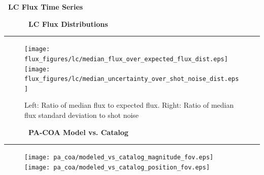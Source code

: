 \vspace{2in}
\centering
{\Huge {\bf \quarter\ LC Flux Time Series}}



\cleardoublepage
\begin{figure}[h!]
  \centering
  \hfill
  {\Huge {\bf \quarter\ LC Flux Distributions}}
  \hfill
\end{figure}
\hrule

\begin{figure}[h!]
  \centering
  \texttt{[image: flux\_figures/lc/median\_flux\_over\_expected\_flux\_dist.eps]}
  \texttt{[image: flux\_figures/lc/median\_uncertainty\_over\_shot\_noise\_dist.eps]}
  \caption{Left: Ratio of median flux to expected flux.  Right: Ratio of median flux standard deviation to shot noise}
\end{figure}


\cleardoublepage
\begin{figure}[h!]
  \centering
  \hfill
  {\Huge {\bf \quarter\ PA-COA Model vs. Catalog}}
  \hfill
\end{figure}
\hrule

\begin{figure}[h!]
  \centering
  \texttt{[image: pa\_coa/modeled\_vs\_catalog\_magnitude\_fov.eps]}
  \texttt{[image: pa\_coa/modeled\_vs\_catalog\_position\_fov.eps]}
\end{figure}

